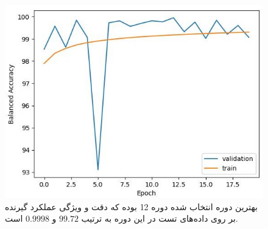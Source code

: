 \begin{figure}
	\begin{center}
		\includegraphics[width=0.8\linewidth]{figs/suggested_methods/val_train_acc_final.jpeg}
	\end{center}
	\caption[نمودار دقت در هر دوره آموزش]{بهترین دوره انتخاب شده دوره 12 بوده که دقت و ویژگی عملکرد گیرنده  بر روی داده‌های تست در این دوره به ترتیب $99.72$ و $0.9998$ است.}
	\label{nci_dataset_with_resnet101_results}
\end{figure}





